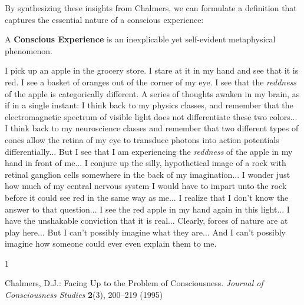 \documentclass[runningheads]{llncs}
\begin{document}
By synthesizing these insights from Chalmers, we can formulate a definition that captures the essential nature of a conscious experience:

\setcounter{definition}{0}
\begin{cdefinition}
A \textbf{Conscious Experience} is an inexplicable yet self-evident metaphysical phenomenon.
\end{cdefinition}

\setcounter{definition}{0}
\begin{cexample}
I pick up an apple in the grocery store. 
I stare at it in my hand and see that it is red. 
I see a basket of oranges out of the corner of my eye. 
I see that the \textit{reddness} of the apple is categorically different. 
A series of thoughts awaken in my brain, as if in a single instant:
I think back to my physics classes, and remember that the electromagnetic spectrum of visible light does not differentiate these two colors... 
I think back to my neuroscience classes and remember that two different types of cones allow the retina of my eye to transduce photons into action potentials differentially... 
But I see that I am experiencing the \textit{reddness} of the apple in my hand in front of me... 
I conjure up the silly, hypothetical image of a rock with retinal ganglion cells somewhere in the back of my imagination...
I wonder just how much of my central nervous system I would have to impart unto the rock before it could see red in the same way as me... 
I realize that I don't know the answer to that question... 
I see the red apple in my hand again in this light...
I have the unshakable conviction that it is real... 
Clearly, forces of nature are at play here...  
But I can't possibly imagine what they are... 
And I can't possibly imagine how someone could ever even explain them to me. 
\end{cexample}


\begin{thebibliography}{1}

Chalmers, D.J.: Facing Up to the Problem of Consciousness. \textit{Journal of Consciousness Studies} \textbf{2}(3), 200--219 (1995)

\end{thebibliography}
\end{document}
